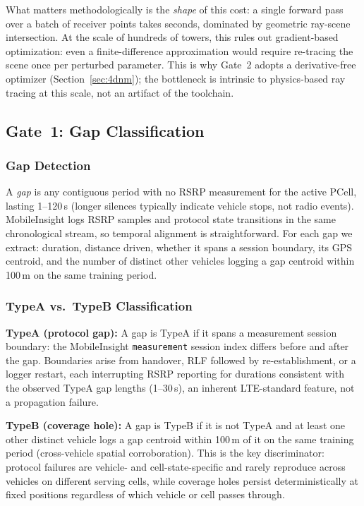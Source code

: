 \documentclass[conference]{IEEEtran}
\begin{document}
What matters methodologically is the \emph{shape} of this cost: a
single forward pass over a batch of receiver points takes seconds,
dominated by geometric ray-scene intersection. At the scale of hundreds
of towers, this rules out gradient-based optimization: even a
finite-difference approximation would require re-tracing the scene
once per perturbed parameter. This is why Gate~2 adopts a
derivative-free optimizer (Section~\ref{sec:4dnm}); the bottleneck is
intrinsic to physics-based ray tracing at this scale, not an artifact
of the toolchain.

\subsection{Gate~1: Gap Classification}
\label{sec:gate1}

\subsubsection{Gap Detection}

A \emph{gap} is any contiguous period with no RSRP measurement for the
active PCell, lasting 1--120\,s (longer silences typically indicate
vehicle stops, not radio events). MobileInsight logs RSRP samples and
protocol state transitions in the same chronological stream, so
temporal alignment is straightforward. For each gap we extract:
duration, distance driven, whether it spans a session boundary, its GPS
centroid, and the number of distinct other vehicles logging a gap
centroid within 100\,m on the same training period.

\subsubsection{TypeA vs.\ TypeB Classification}

\textbf{TypeA (protocol gap):} A gap is TypeA if it spans a measurement
session boundary: the MobileInsight \texttt{measurement} session index
differs before and after the gap. Boundaries arise from handover, RLF
followed by re-establishment, or a logger restart, each interrupting
RSRP reporting for durations consistent with the observed TypeA gap
lengths (1--30\,s), an inherent LTE-standard feature, not a
propagation failure.

\textbf{TypeB (coverage hole):} A gap is TypeB if it is not TypeA and at
least one other distinct vehicle logs a gap centroid within 100\,m of it
on the same training period (cross-vehicle spatial corroboration).
This is the key discriminator: protocol failures are vehicle- and
cell-state-specific and rarely reproduce across vehicles on different
serving cells, while coverage holes persist deterministically at fixed
positions regardless of which vehicle or cell passes through.
\end{document}
